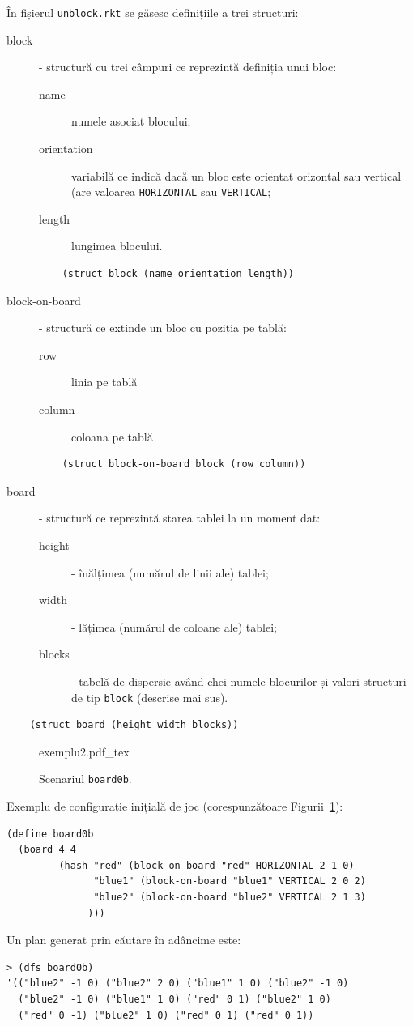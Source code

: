 \documentclass[12pt]{article}
\begin{document}
În fișierul \texttt{unblock.rkt} se găsesc definițiile a trei
structuri:
\begin{description}
\item[block] - structură cu trei câmpuri ce reprezintă definiția unui
  bloc:
  \begin{description}
  \item[name] numele asociat blocului;
  \item[orientation] variabilă ce indică dacă un bloc este orientat
    orizontal sau vertical (are valoarea \texttt{HORIZONTAL} sau
    \texttt{VERTICAL};
  \item[length] lungimea blocului.
  \end{description}
\begin{verbatim}
    (struct block (name orientation length))
\end{verbatim}
\item[block-on-board] - structură ce extinde un bloc cu poziția pe
  tablă:
  \begin{description}
  \item[row] linia pe tablă
  \item[column] coloana pe tablă
  \end{description}
\begin{verbatim}
    (struct block-on-board block (row column))
\end{verbatim}
\item[board] - structură ce reprezintă starea tablei la un moment dat:
  \begin{description}
  \item[height] - înălțimea (numărul de linii ale) tablei;
  \item[width] - lățimea (numărul de coloane ale) tablei;
  \item[blocks] - tabelă de dispersie având chei numele blocurilor și
    valori structuri de tip \texttt{block} (descrise mai sus).
  \end{description}
\end{description}
\begin{verbatim}
    (struct board (height width blocks))
\end{verbatim}

\begin{figure}[h!]
  \centering {}{exemplu2.pdf_tex}
  \caption{Scenariul \texttt{board0b}.}
  \label{fig:4}
\end{figure}

Exemplu de configurație inițială de joc (corespunzătoare Figurii~\ref{fig:4}):
\begin{verbatim}
(define board0b
  (board 4 4
         (hash "red" (block-on-board "red" HORIZONTAL 2 1 0)
               "blue1" (block-on-board "blue1" VERTICAL 2 0 2)
               "blue2" (block-on-board "blue2" VERTICAL 2 1 3)
              )))
\end{verbatim}
Un plan generat prin căutare în adâncime este:
\begin{verbatim}
> (dfs board0b)
'(("blue2" -1 0) ("blue2" 2 0) ("blue1" 1 0) ("blue2" -1 0)
  ("blue2" -1 0) ("blue1" 1 0) ("red" 0 1) ("blue2" 1 0)
  ("red" 0 -1) ("blue2" 1 0) ("red" 0 1) ("red" 0 1))
\end{verbatim}
\end{document}
